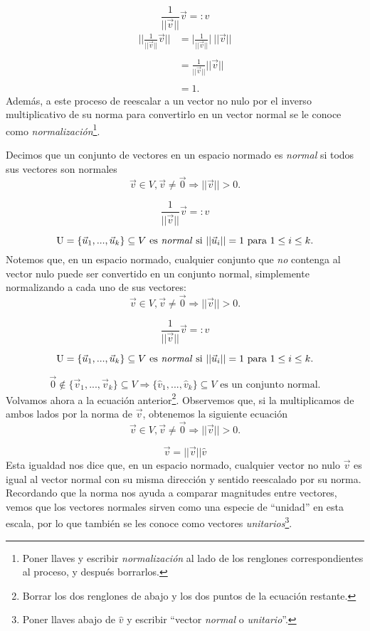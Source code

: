 \documentclass[12pt,dvipsnames]{article}
\numberwithin{equation}{section}
\begin{document}
\[
\frac{1}{||\vec{v}||} \vec{v} =: \hat{v}
\] 
\begin{align*}
                \bigg|\bigg|\frac{1}{||\vec{v}||} \vec{v} \bigg|\bigg| &= \bigg| \frac{1}{||\vec{v}||} \bigg| \ ||\vec{v}|| \\ \\
                                                                       &= \frac{1}{||\vec{v}||} ||\vec{v}|| \\ \\
                                                                       &=1.
\end{align*}
Además, a este proceso de reescalar a un vector no nulo por el inverso multiplicativo de su norma para convertirlo en un vector normal se le conoce como \emph{normalización}\footnote{Poner llaves y escribir \emph{normalización} al lado de los renglones correspondientes al proceso, y después borrarlos.}.

Decimos que un conjunto de vectores en un espacio normado es \emph{normal} si todos sus vectores son normales
\[
    \vec{v}\in V, \vec{v}\neq \vec{0} \Rightarrow ||\vec{v}||>0.
\] 

\[
    \frac{1}{||\vec{v}||} \vec{v} =: \hat{v}
\] 

\[
    \text{U}=\{\vec{u}_1,...,\vec{u}_k\}\subseteq V \ \text{es \emph{normal} si } ||\vec{u}_i|| = 1 \text{ para } 1\le i\le k.
\]
Notemos que, en un espacio normado, cualquier conjunto que \emph{no} contenga al vector nulo puede ser convertido en un conjunto normal, simplemente normalizando a cada uno de sus vectores:
\[
    \vec{v}\in V, \vec{v}\neq \vec{0} \Rightarrow ||\vec{v}||>0.
\] 

\[
    \frac{1}{||\vec{v}||} \vec{v} =: \hat{v}
\] 

\[
    \text{U}=\{\vec{u}_1,...,\vec{u}_k\}\subseteq V \ \text{es \emph{normal} si } ||\vec{u}_i|| = 1 \text{ para } 1\le i\le k.
\]

\[
\vec{0}\notin\{\vec{v}_1,...,\vec{v}_k\}\subseteq V \Rightarrow \{\hat{v}_1, ..., \hat{v}_k\}\subseteq V \text{ es un conjunto normal}.
\] 
Volvamos ahora a la ecuación anterior\footnote{Borrar los dos renglones de abajo y los dos puntos de la ecuación restante.}. Observemos que, si la multiplicamos de ambos lados por la norma de $\vec{v}$, obtenemos la siguiente ecuación
\[
    \vec{v}\in V, \vec{v}\neq \vec{0} \Rightarrow ||\vec{v}||>0.
\] 

\[
    \vec{v}= ||\vec{v}|| \hat{v}
\] 
Esta igualdad nos dice que, en un espacio normado, cualquier vector no nulo $\vec{v}$ es igual al vector normal con su misma dirección y sentido reescalado por su norma. Recordando que la norma nos ayuda a comparar magnitudes entre vectores, vemos que los vectores normales sirven como una especie de ``unidad'' en esta escala, por lo que también se les conoce como vectores \emph{unitarios}\footnote{Poner llaves abajo de $\hat{v}$ y escribir ``vector \emph{normal} o \emph{unitario}''.}. 
\end{document}
